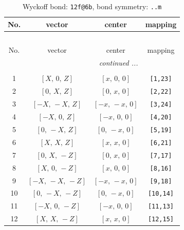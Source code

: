 \documentclass[fleqn,8pt]{jsarticle}
\begin{document}
\begin{longtable}{cccc}
\caption{Wyckoff bond: {\tt 12f@6b}, bond symmetry: {\tt ..m}}
 \\
 \hline \hline
No. & vector & center & mapping \\ \hline \endfirsthead

\multicolumn{3}{l}{\tablename\ \thetable{}} \\
 \hline \hline
No. & vector & center & mapping \\ \hline \endhead

 \hline \hline
\multicolumn{3}{r}{\footnotesize\it continued ...} \\ \endfoot

 \hline \hline
\multicolumn{3}{r}{} \\ \endlastfoot

1 & $\left[ X,\, 0,\, Z \right]$ & $\left[ x,\, 0,\, 0 \right]$ & {\tt [1,23]} \\ \hline
2 & $\left[ 0,\, X,\, Z \right]$ & $\left[ 0,\, x,\, 0 \right]$ & {\tt [2,22]} \\ \hline
3 & $\left[ - X,\, - X,\, Z \right]$ & $\left[ - x,\, - x,\, 0 \right]$ & {\tt [3,24]} \\ \hline
4 & $\left[ - X,\, 0,\, Z \right]$ & $\left[ - x,\, 0,\, 0 \right]$ & {\tt [4,20]} \\ \hline
5 & $\left[ 0,\, - X,\, Z \right]$ & $\left[ 0,\, - x,\, 0 \right]$ & {\tt [5,19]} \\ \hline
6 & $\left[ X,\, X,\, Z \right]$ & $\left[ x,\, x,\, 0 \right]$ & {\tt [6,21]} \\ \hline
7 & $\left[ 0,\, X,\, - Z \right]$ & $\left[ 0,\, x,\, 0 \right]$ & {\tt [7,17]} \\ \hline
8 & $\left[ X,\, 0,\, - Z \right]$ & $\left[ x,\, 0,\, 0 \right]$ & {\tt [8,16]} \\ \hline
9 & $\left[ - X,\, - X,\, - Z \right]$ & $\left[ - x,\, - x,\, 0 \right]$ & {\tt [9,18]} \\ \hline
10 & $\left[ 0,\, - X,\, - Z \right]$ & $\left[ 0,\, - x,\, 0 \right]$ & {\tt [10,14]} \\ \hline
11 & $\left[ - X,\, 0,\, - Z \right]$ & $\left[ - x,\, 0,\, 0 \right]$ & {\tt [11,13]} \\ \hline
12 & $\left[ X,\, X,\, - Z \right]$ & $\left[ x,\, x,\, 0 \right]$ & {\tt [12,15]} \\
\end{longtable}
\renewcommand{\arraystretch}{1.2}
\end{document}
